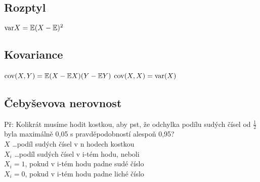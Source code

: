     \subsection{Rozptyl}
        $\mathrm{var} X = \mathbb{E}(X-\mathbb{E})^2$
    \subsection{Kovariance}
        $\mathrm{cov}(X,Y)=\mathbb{E}(X-\mathbb{E}X)(Y-\mathbb{E}Y)$
        $\mathrm{cov}(X,X)=\mathrm{var}(X)$
    \subsection{Čebyševova nerovnost}
    
\newpage

Př:
Kolikrát musíme hodit kostkou, aby pst, že odchylka podílu sudých čísel od $\frac{1}{2}$
byla maximálně 0,05 s pravděpodobností alespoň 0,95?\\
$X$ \dots podíl sudých čísel v n hodech kostkou\\
$X_i$ \dots podíl sudých čísel v i-tém hodu, neboli\\
$X_i = 1$, pokud v i-tém hodu padne sudé číslo\\
$X_i = 0$, pokud v i-tém hodu padne liché číslo

        
